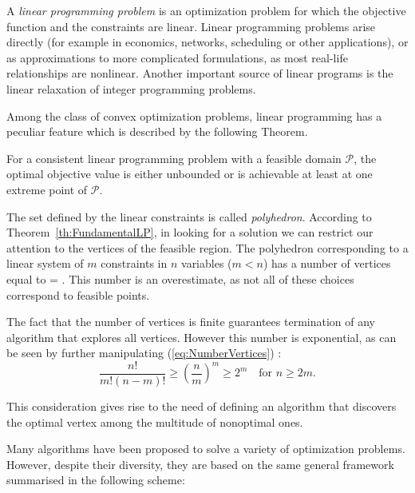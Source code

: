 A {\em linear programming problem} is an optimization problem for which
the objective function and the constraints are linear. 
Linear programming problems arise directly (for example in economics,
networks, scheduling or other applications), or as approximations to
more complicated formulations, as most real-life relationships are
nonlinear. Another important source of linear programs is the 
linear relaxation of integer programming problems.

Among the class of convex optimization problems, linear programming
has a peculiar feature which is described by the following Theorem.

\begin{theorem}
\label{th:FundamentalLP}
For a consistent linear programming problem with a
feasible domain $\mathcal{P}$, the optimal objective value is either
unbounded or is achievable at least at one extreme point of $\mathcal{P}$.
\end{theorem}

The set defined by the linear constraints is called {\em polyhedron}.
According to Theorem~\ref{th:FundamentalLP}, in looking for a solution 
we can restrict our 
attention to the vertices of the feasible region.
The polyhedron corresponding to a linear system of $m$ constraints 
in $n$ variables ($m < n$) has a number of vertices equal to
\be \label{eq:NumberVertices}
 = .
\ee
This number is an overestimate, as not all of these choices correspond
to feasible points.

The fact that the number of vertices is finite guarantees termination 
of any algorithm that explores all vertices.
However this number is exponential, as can be seen by further
manipulating (\ref{eq:NumberVertices}) \cite[ch.~5.2]{FangPuthenpura93}:
\[
\frac{n!}{m!(n-m)!} \ge \left( \frac{n}{m} \right)^m \ge 2^m 
\quad \mbox{for } n \ge 2m.
\]

This consideration gives rise to the need of defining an algorithm
that discovers the optimal vertex among the multitude of nonoptimal ones.

Many algorithms have been proposed to solve a variety of optimization
problems. However, despite their diversity, they are based on the same 
general framework summarised in the following scheme:


